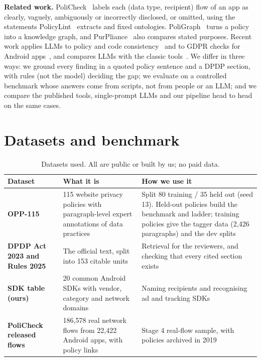\documentclass[11pt,a4paper]{article}
\newcommand{\rowline}{\specialrule{0.2pt}{3pt}{3pt}}
\begin{document}
\textbf{Related work.} PoliCheck~\cite{policheck} labels each (data type, recipient) flow of an app
as clearly, vaguely, ambiguously or incorrectly disclosed, or omitted, using the statements
PolicyLint~\cite{policylint} extracts and fixed ontologies. PoliGraph~\cite{poligraph} turns a policy
into a knowledge graph, and PurPliance~\cite{purpliance} also compares stated purposes. Recent work
applies LLMs to policy and code consistency~\cite{mao2025} and to GDPR checks for Android
apps~\cite{alecci2025}, and compares LLMs with the classic tools~\cite{aryal2026}. We differ in three
ways: we ground every finding in a quoted policy sentence and a DPDP section, with rules (not the
model) deciding the gap; we evaluate on a controlled benchmark whose answers come from scripts, not
from people or an LLM; and we compare the published tools, single-prompt LLMs and our pipeline
head to head on the same cases.

\section{Datasets and benchmark}

\begin{table}[H]
\centering
\small
\begin{tabular}{L{3.6cm}L{5.2cm}L{5.4cm}}
\toprule
Dataset & What it is & How we use it \\
\midrule
\textbf{OPP-115~\cite{opp115}} & 115 website privacy policies with paragraph-level expert
annotations of data practices & Split 80 training / 35 held out (seed 13). Held-out policies build
the benchmark and ladder; training policies give the tagger data (2,426 paragraphs) and the dev
splits \\ \rowline
\textbf{DPDP Act 2023 and Rules 2025~\cite{dpdpact,dpdprules}} & The official text, split into 153
citable units & Retrieval for the reviewers, and checking that every cited section exists \\ \rowline
\textbf{SDK table (ours)} & 20 common Android SDKs with vendor, category and network domains &
Naming recipients and recognising ad and tracking SDKs \\ \rowline
\textbf{PoliCheck released flows~\cite{policheck}} & 186,578 real network flows from 22,422 Android
apps, with policy links & Stage 4 real-flow sample, with policies archived in 2019 \\
\bottomrule
\end{tabular}
\caption{Datasets used. All are public or built by us; no paid data.}
\end{table}
\end{document}
